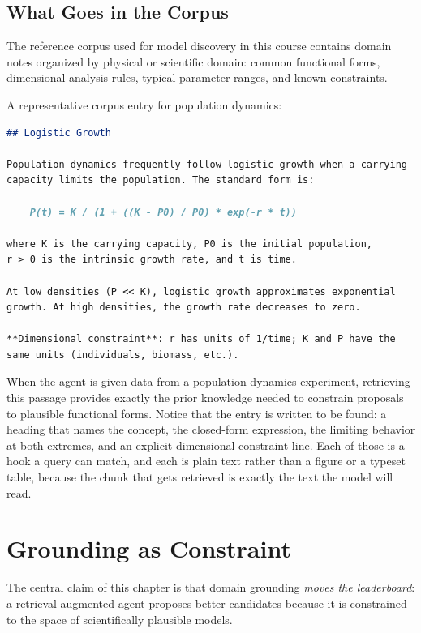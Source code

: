 \subsection{What Goes in the Corpus}

The reference corpus used for model discovery in this course contains domain notes organized by physical or scientific domain: common functional forms, dimensional analysis rules, typical parameter ranges, and known constraints.

\begin{example}
A representative corpus entry for population dynamics:
\begin{lstlisting}[language=markdown]
## Logistic Growth

Population dynamics frequently follow logistic growth when a carrying
capacity limits the population. The standard form is:

    P(t) = K / (1 + ((K - P0) / P0) * exp(-r * t))

where K is the carrying capacity, P0 is the initial population,
r > 0 is the intrinsic growth rate, and t is time.

At low densities (P << K), logistic growth approximates exponential
growth. At high densities, the growth rate decreases to zero.

**Dimensional constraint**: r has units of 1/time; K and P have the
same units (individuals, biomass, etc.).
\end{lstlisting}
When the agent is given data from a population dynamics experiment, retrieving this passage provides exactly the prior knowledge needed to constrain proposals to plausible functional forms.
Notice that the entry is written to be found: a heading that names the concept, the closed-form expression, the limiting behavior at both extremes, and an explicit dimensional-constraint line.
Each of those is a hook a query can match, and each is plain text rather than a figure or a typeset table, because the chunk that gets retrieved is exactly the text the model will read.
\end{example}

\section{Grounding as Constraint}
\label{section:GroundingConstraint}

The central claim of this chapter is that domain grounding \emph{moves the leaderboard}: a retrieval-augmented agent proposes better candidates because it is constrained to the space of scientifically plausible models.

